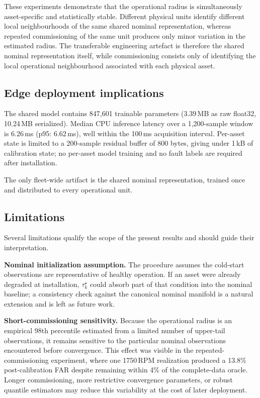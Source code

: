 \documentclass[numbered]{trbunofficial}
\begin{document}
These experiments demonstrate that the operational radius is simultaneously
asset-specific and statistically stable. Different physical units identify
different local neighbourhoods of the same shared nominal representation,
whereas repeated commissioning of the same unit produces only minor variation
in the estimated radius. The transferable engineering artefact is therefore
the shared nominal representation itself, while commissioning consists only
of identifying the local operational neighbourhood associated with each
physical asset.


\subsection{Edge deployment implications}
\label{sec:edge-results}

The shared model contains 847,601 trainable parameters (3.39\,MB as raw
float32, 10.24\,MB serialized). Median CPU inference latency over a
1,200-sample window is 6.26\,ms (p95: 6.62\,ms), well within the 100\,ms
acquisition interval. Per-asset state is limited to a 200-sample residual
buffer of 800 bytes, giving under 1\,kB of calibration state; no per-asset
model training and no fault labels are required after installation.

The only fleet-wide artifact is the shared nominal representation, trained
once and distributed to every operational unit.

\subsection{Limitations}
\label{sec:limitations}

Several limitations qualify the scope of the present results and should guide their
interpretation.

\textbf{Nominal initialization assumption.} The procedure assumes the cold-start observations are
representative of healthy operation. If an asset were already degraded at installation,
$\tau_k^\star$ could absorb part of that condition into the nominal baseline; a consistency check
against the canonical nominal manifold is a natural extension and is left as future work.

\textbf{Short-commissioning sensitivity.}
Because the operational radius is an empirical 98th percentile estimated
from a limited number of upper-tail observations, it remains sensitive to
the particular nominal observations encountered before convergence. This
effect was visible in the repeated-commissioning experiment, where one
1750\,RPM realization produced a 13.8\% post-calibration FAR despite
remaining within 4\% of the complete-data oracle. Longer commissioning,
more restrictive convergence parameters, or robust quantile estimators may
reduce this variability at the cost of later deployment.
\end{document}

